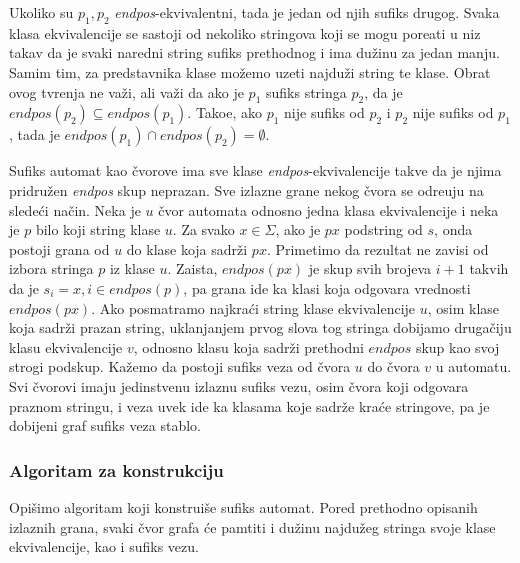 Ukoliko su $p_1,p_2$ \textit{endpos}-ekvivalentni, tada je jedan od njih sufiks drugog. Svaka klasa ekvivalencije se sastoji od nekoliko stringova koji se mogu pore\dj ati u niz takav da je svaki naredni string sufiks prethodnog i ima du\v zinu za jedan manju. Samim tim, za predstavnika klase mo\v zemo uzeti najdu\v zi string te klase. Obrat ovog tvr\dj enja ne va\v zi, ali va\v zi da ako je $p_1$ sufiks stringa $p_2$, da je $endpos(p_2) \subseteq endpos(p_1)$. Tako\dj e, ako $p_1$ nije sufiks od $p_2$ i $p_2$ nije sufiks od $p_1$, tada je $endpos(p_1) \cap endpos(p_2) = \emptyset$. \cite{suffixautomatonrad}

Sufiks automat kao \v cvorove ima sve klase \textit{endpos}-ekvivalencije takve da je njima pridru\v zen \textit{endpos} skup neprazan. Sve izlazne grane nekog \v cvora se odre\dj uju na slede\' ci na\v cin. Neka je $u$ \v cvor automata odnosno jedna klasa ekvivalencije i neka je $p$ bilo koji string klase $u$. Za svako $x \in \Sigma$, ako je $px$ podstring od $s$, onda postoji grana od $u$ do klase koja sadr\v zi $px$. Primetimo da rezultat ne zavisi od izbora stringa $p$ iz klase $u$. Zaista, $endpos(px)$ je skup svih brojeva $i+1$ takvih da je $s_i = x, i \in endpos(p)$, pa grana ide ka klasi koja odgovara vrednosti $endpos(px)$. Ako posmatramo najkra\' ci string klase ekvivalencije $u$, osim klase koja sadr\v zi prazan string, uklanjanjem prvog slova tog stringa dobijamo druga\v ciju klasu ekvivalencije $v$, odnosno klasu koja sadr\v zi prethodni $endpos$ skup kao svoj strogi podskup. Ka\v zemo da postoji sufiks veza od \v cvora $u$ do \v cvora $v$ u automatu. Svi \v cvorovi imaju jedinstvenu izlaznu sufiks vezu, osim \v cvora koji odgovara praznom stringu, i veza uvek ide ka klasama koje sadr\v ze kra\' ce stringove, pa je dobijeni graf sufiks veza stablo.

\subsubsection{Algoritam za konstrukciju}

Opi\v simo algoritam koji konstrui\v se sufiks automat. Pored prethodno opisanih izlaznih grana, svaki \v cvor grafa \' ce pamtiti i du\v zinu najdu\v zeg stringa svoje klase ekvivalencije, kao i sufiks vezu.

\noindent
\begin{minipage}[l]{\textwidth}

\end{minipage}

